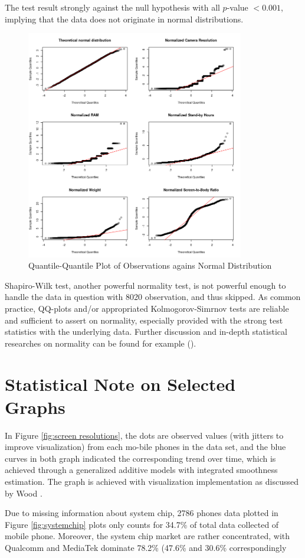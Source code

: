 \documentclass[utf8,english]{gradu3}
\begin{document}
The test result strongly against the null hypothesis with all $p$-value $< 0.001$, implying that the data does not originate in normal distributions.

\begin{figure}[htb]
    \centering
    \includegraphics[width=0.85\textwidth]{qqplots.png}
    \caption{Quantile-Quantile Plot of Observations agains Normal Distribution}
    \label{fig:qqplots}
\end{figure}

Shapiro-Wilk test, another powerful normality test, is not powerful enough to handle the data in question with 8020 observation, and thus skipped. As common practice, QQ-plots and/or appropriated Kolmogorov-Simrnov tests are reliable and sufficient to assert on normality, especially provided with the strong test statistics with the underlying data. Further discussion and in-depth statistical researches on normality can be found for example \citeauthor{ghasemi2012normality} (\citeauthor{ghasemi2012normality}).

\section{Statistical Note on Selected Graphs}
\label{app:stats note}

In Figure \ref{fig:screen resolutions}, the dots are observed values (with jitters to improve visualization) from each mo-bile phones in the data set, and the blue curves in both graph indicated the corresponding trend over time, which is achieved through a generalized additive models with integrated smoothness estimation. The graph is achieved with visualization implementation as discussed by Wood \citeyear{wood2001mgcv}.

Due to missing information about system chip, 2786 phones data plotted in Figure \ref{fig:systemchip} plots only counts for 34.7\% of total data collected of mobile phone. Moreover, the system chip market are rather concentrated, with Qualcomm and MediaTek dominate 78.2\% (47.6\% and 30.6\% correspondingly
\end{document}
